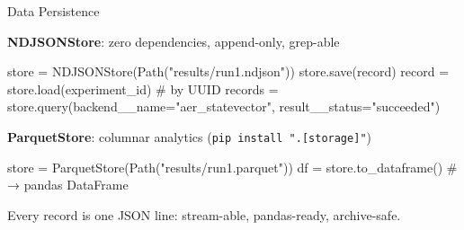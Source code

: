 \documentclass[
  ignorenonframetext,
  aspectratio=169,
]{beamer}
\newenvironment{Shaded}{\begin{snugshade}}{\end{snugshade}}
\newcommand{\CommentTok}[1]{\textcolor[rgb]{0.48,0.49,0.49}{#1}}
\newcommand{\NormalTok}[1]{\textcolor[rgb]{0.81,0.81,0.76}{#1}}
\newcommand{\OperatorTok}[1]{\textcolor[rgb]{0.81,0.81,0.76}{#1}}
\newcommand{\StringTok}[1]{\textcolor[rgb]{0.96,0.31,0.31}{#1}}
\begin{document}
\begin{frame}[fragile]{Data Persistence}
\label{data-persistence}
\footnotesize

\textbf{NDJSONStore}: zero dependencies, append-only, grep-able

\begin{Shaded}
\begin{Highlighting}[]
\NormalTok{store }\OperatorTok{=}\NormalTok{ NDJSONStore(Path(}\StringTok{"results/run1.ndjson"}\NormalTok{))}
\NormalTok{store.save(record)}
\NormalTok{record  }\OperatorTok{=}\NormalTok{ store.load(experiment\_id)           }\CommentTok{\# by UUID}
\NormalTok{records }\OperatorTok{=}\NormalTok{ store.query(backend\_\_name}\OperatorTok{=}\StringTok{"aer\_statevector"}\NormalTok{, result\_\_status}\OperatorTok{=}\StringTok{"succeeded"}\NormalTok{)}
\end{Highlighting}
\end{Shaded}

\textbf{ParquetStore}: columnar analytics
(\texttt{pip\ install\ ".{[}storage{]}"})

\begin{Shaded}
\begin{Highlighting}[]
\NormalTok{store }\OperatorTok{=}\NormalTok{ ParquetStore(Path(}\StringTok{"results/run1.parquet"}\NormalTok{))}
\NormalTok{df }\OperatorTok{=}\NormalTok{ store.to\_dataframe()                     }\CommentTok{\# → pandas DataFrame}
\end{Highlighting}
\end{Shaded}

Every record is one JSON line: stream-able, pandas-ready, archive-safe.
\normalsize
\end{frame}
\end{document}
